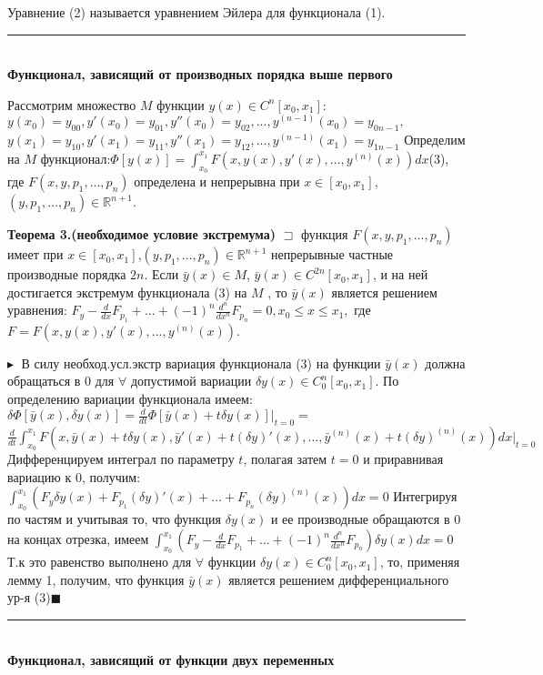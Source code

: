 Уравнение (2) называется уравнением Эйлера для функционала (1).

\rule{275pt}{0.5pt} \\
\textbf{\large Функционал, зависящий от производных порядка выше
первого}

Рассмотрим множество $M$ функции $y(x) \in C^n[x_0, x_1]:$
$y(x_0) = y_{00} , y'(x_0) = y_{01}, y''(x_0) = y_{02},..., y^{(n-1)}(x_0) = y_{0n-1},$
$y(x_1) = y_{10} , y'(x_1) = y_{11}, y''(x_1) = y_{12},..., y^{(n-1)}(x_1) = y_{1n-1}$
Определим на $M$ функционал:$\Phi[y(x)]=\int_{x_0}^{x_1}F(x,y(x),y'(x),...,y^{(n)}(x))dx$(3), где $F(x,y,p_1,...,p_n)$ определена и непрерывна при $x \in [x_0, x_1]$,
$(y,p_1,..., p_n) \in \mathbb{R}^{n+1}$.

\textbf{Теорема 3.(необходимое условие экстремума)}
    $\sqsupset$ функция $F(x,y,p_1,...,p_n)$ имеет при $x\in[x_0, x_1]$,$(y,p_1,..., p_n) \in \mathbb{R}^{n+1}$ непрерывные частные производные порядка $2n$. Если  $\bar y(x) \in M$, $\bar y(x) \in C^{2n}[x_0, x_1]$, и на ней достигается экстремум функционала (3) на $M$ , то $\bar y(x)$ является решением уравнения:
    $F_y-\frac{d}{dx}F_{p_1}+...+(-1)^n\frac{d^n}{dx^n}F_{p_n}=0, x_0 \leq x \leq x_1,$
    где $F = F(x,y(x),y'(x),..., y^{(n)}(x))$.
    
$\blacktriangleright\;$
    В силу необход.усл.экстр вариация
    функционала (3) на функции $\bar y(x)$ должна обращаться в 0 для
    $\forall$ допустимой вариации $\delta y(x) \in C^n_0[x_0, x_1]$.
    По определению вариации функционала имеем:
    $\delta\Phi[\bar y(x), \delta y(x)]=\frac{d}{dt}\Phi[\bar y(x)+t\delta y(x)]\Big|_{t=0}=$
    $\frac{d}{dt}\int_{x_0}^{x_1}F(x,\bar y(x) + t\delta y(x), \bar y'(x)+t(\delta y)'(x),...,\bar y^{(n)}(x)+t(\delta y)^{(n)}(x))dx\Big|_{t=0}$
    Дифференцируем интеграл по параметру $t$, полагая затем $t = 0$ и приравнивая вариацию к 0, получим:
    $\int_{x_0}^{x_1}(F_y\delta y(x) + F_{p_1}(\delta y)'(x)+...+F_{p_n}(\delta y)^{(n)}(x))dx=0$
    Интегрируя по частям и учитывая то, что функция $\delta y(x)$ и ее производные обращаются в 0 на концах отрезка, имеем
    $\int_{x_0}^{x_1} (F_y-\frac{d}{dx}F_{p_1}+...+(-1)^n\frac{d^n}{dx^n}F_{p_n})\delta y(x) dx=0$
    Т.к это равенство выполнено для $\forall$ функции $\delta y(x) \in C^n_0[x_0, x_1]$,
    то, применяя лемму 1, получим, что
    функция $\bar y(x)$ является решением дифференциального ур-я (3)$\blacksquare$

\rule{275pt}{0.5pt} \\
\textbf{\large Функционал, зависящий от функции двух переменных}


